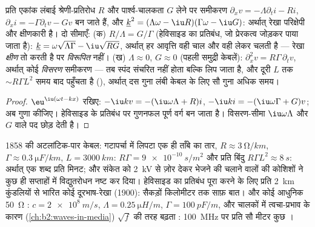 \begin{proposition}[हानिकर रेखा; विरूपण-रहित प्रतिबंध]\label{prop:b2:dispersion-wave-packets:lossy}
प्रति एकांक लंबाई श्रेणी-प्रतिरोध $R$ और पार्श्व-चालकता $G$ लेने पर
समीकरण $\partial_xv = -\Lambda\partial_ti - Ri$, $\partial_xi =
-\Gamma\partial_tv - Gv$ बन जाते हैं, और  $\underline k^2 = (\Lambda\omega -
\iu R)(\Gamma\omega - \iu G)$: अर्थात् रेखा परिक्षेपी और क्षीणकारी है। दो
सीमाएँ: (क) $R/\Lambda = G/\Gamma$ (हेविसाइड का प्रतिबंध, जो प्रेरकत्व जोड़कर
पाया जाता है): $\underline k = \omega\sqrt{\Lambda\Gamma} - \iu\sqrt{RG}$, अर्थात् हर आवृत्ति
वही चाल और वही  लेकर चलती है --- रेखा
\emph{क्षीण} तो करती है पर \emph{विरूपित} नहीं। (ख) $\Lambda \approx 0$, $G \approx 0$
(पहली समुद्री केबलें): $\partial_x^2v = R\Gamma\,\partial_tv$, अर्थात् कोई
\emph{विसरण} समीकरण --- तब स्पंद संचरित नहीं होता बल्कि लिप जाता है,
और दूरी $L$ तक $\sim R\Gamma L^2$ समय बाद पहुँचता है (), अर्थात् दस गुना लंबी केबल के लिए सौ गुना अधिक समय।
\end{proposition}

\begin{proof}
$\eu^{\iu(\omega t - kx)}$ रखिए: $-\iu kv = -(\iu\omega\Lambda + R)i$, $-\iu ki = -(\iu
\omega\Gamma + G)v$; अब गुणा कीजिए। हेविसाइड के प्रतिबंध पर गुणनफल
पूर्ण वर्ग बन जाता है। विसरण-सीमा $\iu\omega\Lambda$ और $G$ वाले पद छोड़ देती है।
\end{proof}

\begin{example}[तीन केबलें]\label{ex:b2:dispersion-wave-packets:cables}
1858 की अटलांटिक-पार केबल: गटापर्चा में लिपटा एक ही ताँबे का तार,
$R \approx \qty{3}{\ohm/km}$, $\Gamma \approx \qty{0.3}{\micro F/km}$, $L = \qty{3000}{km}$:
$R\Gamma = \qty{9e-10}{s/m^2}$ और प्रति बिंदु $R\Gamma L^2 \approx \qty{8}{s}$: अर्थात् एक शब्द प्रति
मिनट; और संकेत को \qty{2}{kV} से ज़ोर देकर भेजने की चलाने वालों की कोशिशों ने
कुछ ही सप्ताहों में विद्युतरोधन नष्ट कर दिया। हेविसाइड का प्रतिबंध पूरा करने के लिए
प्रति \qty{2}{km} कुंडलियों से भारित कोई दूरभाष-रेखा
(1900): सैकड़ों किलोमीटर तक साफ़ बात। और कोई आधुनिक \qty{50}{\ohm}
: $c = \qty{2e8}{m/s}$, $\Lambda = \qty{0.25}{\micro H/m}$, $\Gamma =
\qty{100}{pF/m}$, और चालकों में त्वचा-प्रभाव के कारण
(\cref{ch:b2:waves-in-media}) $\sqrt f$ की तरह बढ़ता : \qty{100}{MHz} पर
प्रति सौ मीटर कुछ ।
\end{example}

